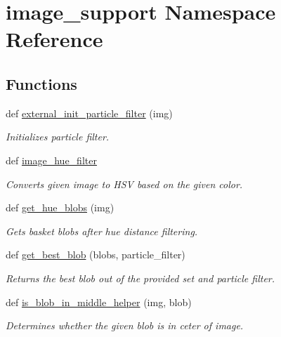 \section{image\+\_\+support Namespace Reference}
\label{namespaceimage__support}
\subsection*{Functions}
\begin{DoxyCompactItemize}
\item 
def \hyperlink{namespaceimage__support_a45e637a8685d23a453229102a4346327}{external\+\_\+init\+\_\+particle\+\_\+filter} (img)
\begin{DoxyCompactList}\small\item\em Initializes particle filter. \end{DoxyCompactList}\item 
def \hyperlink{namespaceimage__support_aff0422e55f0d6119a012115570442c3f}{image\+\_\+hue\+\_\+filter}
\begin{DoxyCompactList}\small\item\em Converts given image to H\+S\+V based on the given color. \end{DoxyCompactList}\item 
def \hyperlink{namespaceimage__support_aaa6d938c26b4ad5878e1bfb6870e749b}{get\+\_\+hue\+\_\+blobs} (img)
\begin{DoxyCompactList}\small\item\em Gets basket blobs after hue distance filtering. \end{DoxyCompactList}\item 
def \hyperlink{namespaceimage__support_a0cebf9b300caec4b9e3f7725204f7f63}{get\+\_\+best\+\_\+blob} (blobs, particle\+\_\+filter)
\begin{DoxyCompactList}\small\item\em Returns the best blob out of the provided set and particle filter. \end{DoxyCompactList}\item 
def \hyperlink{namespaceimage__support_ae76ebc019a04c735f46210bc29e55f76}{is\+\_\+blob\+\_\+in\+\_\+middle\+\_\+helper} (img, blob)
\begin{DoxyCompactList}\small\item\em Determines whether the given blob is in ceter of image. \end{DoxyCompactList}\end{DoxyCompactItemize}


